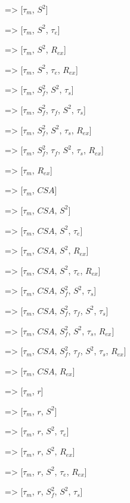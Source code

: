    => [$\tau_m$, $S^2$]
    
   => [$\tau_m$, $S^2$, $\tau_e$]
    
   => [$\tau_m$, $S^2$, $R_{ex}$]
    
   => [$\tau_m$, $S^2$, $\tau_e$, $R_{ex}$]
    
   => [$\tau_m$, $S^2_f$, $S^2$, $\tau_s$]
    
   => [$\tau_m$, $S^2_f$, $\tau_f$, $S^2$, $\tau_s$]
    
   => [$\tau_m$, $S^2_f$, $S^2$, $\tau_s$, $R_{ex}$]
    
   => [$\tau_m$, $S^2_f$, $\tau_f$, $S^2$, $\tau_s$, $R_{ex}$]
    
   => [$\tau_m$, $R_{ex}$]

    
  => [$\tau_m$, $CSA$]
    
  => [$\tau_m$, $CSA$, $S^2$]
    
  => [$\tau_m$, $CSA$, $S^2$, $\tau_e$]
    
  => [$\tau_m$, $CSA$, $S^2$, $R_{ex}$]
    
  => [$\tau_m$, $CSA$, $S^2$, $\tau_e$, $R_{ex}$]
    
  => [$\tau_m$, $CSA$, $S^2_f$, $S^2$, $\tau_s$]
    
  => [$\tau_m$, $CSA$, $S^2_f$, $\tau_f$, $S^2$, $\tau_s$]
    
  => [$\tau_m$, $CSA$, $S^2_f$, $S^2$, $\tau_s$, $R_{ex}$]
    
  => [$\tau_m$, $CSA$, $S^2_f$, $\tau_f$, $S^2$, $\tau_s$, $R_{ex}$]
    
  => [$\tau_m$, $CSA$, $R_{ex}$]

    
  => [$\tau_m$, $r$]
    
  => [$\tau_m$, $r$, $S^2$]
    
  => [$\tau_m$, $r$, $S^2$, $\tau_e$]
    
  => [$\tau_m$, $r$, $S^2$, $R_{ex}$]
    
  => [$\tau_m$, $r$, $S^2$, $\tau_e$, $R_{ex}$]
    
  => [$\tau_m$, $r$, $S^2_f$, $S^2$, $\tau_s$]
    
